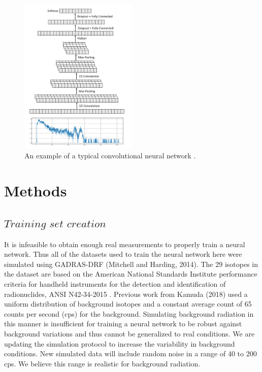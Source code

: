 \documentclass{anstrans}
\begin{document}
\begin{figure}[h]
	\centering
	\includegraphics[width=0.5\textwidth]{cnn-figure.png}
	\caption{An example of a typical convolutional neural network \cite{kamudaComparisonMachineLearning2018a}.}
	\label{fig:cnn}
\end{figure}

\section{Methods}
\subsection{$\textit{Training set creation}$}
It is infeasible to obtain enough real measurements to properly train a neural network. 
Thus all of the datasets used to train the neural network here were simulated using GADRAS-DRF (Mitchell and Harding, 2014). 
The 29 isotopes in the dataset are based on the American National Standards Institute performance criteria for handheld instruments for the detection and identification of radionuclides, ANSI N42-34-2015 \cite{AmericanNationalStandard2016}. 
Previous work from Kamuda (2018) \cite{kamudaComparisonMachineLearning2018a} used a uniform distribution of background isotopes and a constant average count of 65 counts per second (cps) for the background. 
Simulating background radiation in this manner is insufficient for training a neural network to be robust against background variations and thus cannot be generalized to real conditions. 
We are updating the simulation protocol to increase the variability in background conditions. New simulated data will include random noise in a range of 40 to 200 cps. 
We believe this range is realistic for background radiation.
\end{document}
